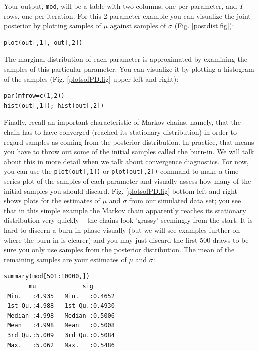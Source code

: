 Your output, \verb#mod#, will be a table with two columns, one per
parameter, and $T$ rows, one per iteration. For this 2-parameter example
you can visualize the joint posterior by plotting samples of $\mu$
against samples of $\sigma$ (Fig. \ref{postdist.fig}):
\begin{verbatim}
plot(out[,1], out[,2])
\end{verbatim}
The marginal distribution of each parameter is approximated by
examining the samples of this particular parameter. You can visualize
it by plotting a histogram of the samples (Fig. \ref{plotsofPD.fig} upper left and right):
\begin{verbatim}
par(mfrow=c(1,2))
hist(out[,1]); hist(out[,2])
\end{verbatim}

Finally, recall an important characteristic of Markov chains, namely,
that the chain has to have converged (reached its stationary
distribution) in order to regard samples as coming from the posterior distribution. In
practice, that means you have to throw out some of the initial samples
called the burn-in. We will talk about this in more detail when we talk
about convergence diagnostics. For now, you can use the
\verb#plot(out[,1])# or \verb#plot(out[,2])# command to make a time
series plot of the samples of each parameter and visually assess how
many of the initial samples you should discard. Fig. \ref{plotsofPD.fig} bottom left and right shows
plots for the estimates of $\mu$ and $\sigma$ from our simulated data set;
you see that in this simple example the Markov chain apparently
reaches its stationary distribution very quickly -- the chains look
'grassy' seemingly from the start. It is hard to discern a burn-in
phase visually (but we will see examples further on where the burn-in
is clearer) and you may just discard the first 500 draws to be sure
you only use samples from the posterior distribution. The mean of the
remaining samples are your estimates of $\mu$ and $\sigma$:
\begin{verbatim}
summary(mod[501:10000,])
       mu             sig
 Min.   :4.935   Min.   :0.4652
 1st Qu.:4.988   1st Qu.:0.4930
 Median :4.998   Median :0.5006
 Mean   :4.998   Mean   :0.5008
 3rd Qu.:5.009   3rd Qu.:0.5084
 Max.   :5.062   Max.   :0.5486
\end{verbatim}

